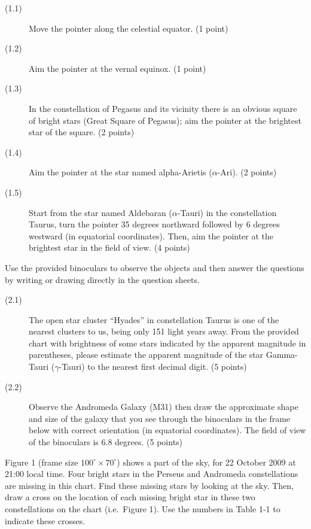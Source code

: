 \begin{description}
\item[(1.1)] Move the pointer along the celestial equator. \hfill(1 point)
\item[(1.2)] Aim the pointer at the vernal equinox. \hfill(1 point)
\item[(1.3)] In the constellation of Pegasus and its vicinity there is an
  obvious square of bright stars (Great Square of Pegasus); aim the pointer
  at the brightest star of the square. \hfill(2 points)
\item[(1.4)] Aim the pointer at the star named alpha-Arietis
  ($\alpha$-Ari). \hfill(2 points)
\item[(1.5)] Start from the star named Aldebaran ($\alpha$-Tauri) in the
  constellation Taurus, turn the pointer 35 degrees northward followed by 6
  degrees westward (in equatorial coordinates). Then, aim the pointer at the
  brightest star in the field of view. \hfill(4 points)
\end{description}

Use the provided binoculars to observe the objects and then answer the
questions by writing or drawing directly in the question sheets.

\begin{description}
\item[(2.1)] The open star cluster ``Hyades'' in constellation Taurus is one
  of the nearest clusters to us, being only 151 light years away. From the
  provided chart with brightness of some stars indicated by the apparent
  magnitude in parentheses, please estimate the apparent magnitude of the
  star Gamma-Tauri ($\gamma$-Tauri) to the nearest first decimal digit.
  \hfill(5 points)


\item[(2.2)] Observe the Andromeda Galaxy (M31) then draw the approximate
  shape and size of the galaxy that you see through the binoculars in the
  frame below with correct orientation (in equatorial coordinates). The
  field of view of the binoculars is 6.8 degrees. \hfill(5 points)

\end{description}

Figure 1 (frame size $100^\circ \times 70^\circ$) shows a part of the sky,
for 22 October 2009 at 21:00 local time. Four bright stars in the Perseus
and Andromeda constellations are missing in this chart. Find these missing
stars by looking at the sky. Then, draw a cross on the location of each
missing bright star in these two constellations on the chart (i.e.\
Figure 1). Use the numbers in Table 1-1 to indicate these crosses.


